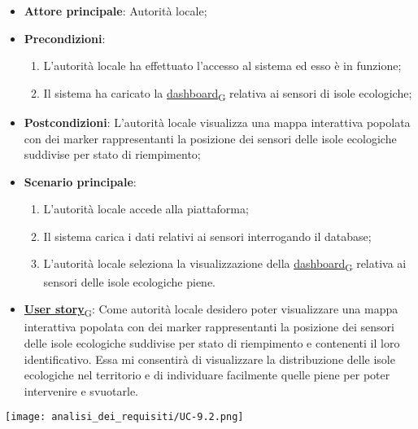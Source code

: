 \begin{itemize}
	\item \textbf{Attore principale}: Autorità locale;
	\item \textbf{Precondizioni}:
	      \begin{enumerate}
		      \item L'autorità locale ha effettuato l'accesso al sistema ed esso è in funzione;
		      \item Il sistema ha caricato la \href{https://7last.github.io/docs/rtb/documentazione-interna/glossario\#dashboard}{dashboard\textsubscript{G}} relativa ai sensori di isole ecologiche;
	      \end{enumerate}
	\item \textbf{Postcondizioni}: L'autorità locale visualizza una mappa interattiva popolata con dei marker rappresentanti la posizione dei sensori delle isole ecologiche
	      suddivise per stato di riempimento;
	\item \textbf{Scenario principale}:
	      \begin{enumerate}
		      \item L'autorità locale accede alla piattaforma;
		      \item Il sistema carica i dati relativi ai sensori interrogando il database;
		      \item L'autorità locale seleziona la visualizzazione della \href{https://7last.github.io/docs/rtb/documentazione-interna/glossario\#dashboard}{dashboard\textsubscript{G}} relativa ai sensori delle isole ecologiche piene.
	      \end{enumerate}
	\item \href{https://7last.github.io/docs/rtb/documentazione-interna/glossario\#user-story}{\textbf{User story}\textsubscript{G}}:
	      Come autorità locale desidero poter visualizzare una mappa interattiva popolata con dei marker rappresentanti la posizione dei sensori delle isole ecologiche
	      suddivise per stato di riempimento e contenenti il loro identificativo.
	      Essa mi consentirà di visualizzare la distribuzione delle isole ecologiche nel territorio e di individuare facilmente quelle piene per poter intervenire e svuotarle.
\end{itemize}
\begin{center}
	\texttt{[image: analisi\_dei\_requisiti/UC-9.2.png]}
\end{center}

